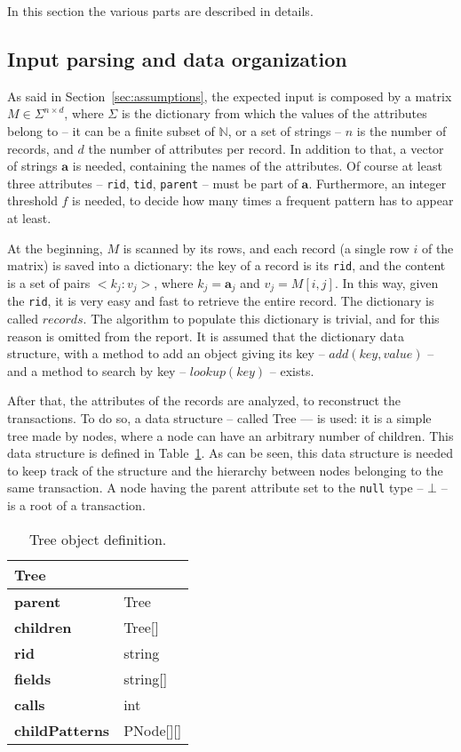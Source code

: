 \documentclass{acm_proc_article-sp-sigmod09}
\begin{document}
In this section the various parts are described in details.

\subsection{Input parsing and data organization}
As said in Section~\ref{sec:assumptions}, the expected input is composed by a matrix $M \in \Sigma^{n \times d}$, where $\Sigma$ is the dictionary from which the values of the attributes belong to -- it can be a finite subset of $\mathbb{N}$, or a set of strings -- $n$ is the number of records, and $d$ the number of attributes per record. In addition to that, a vector of strings $\boldsymbol{a}$ is needed, containing the names of the attributes. Of course at least three attributes -- \texttt{rid}, \texttt{tid}, \texttt{parent} -- must be part of $\boldsymbol{a}$. Furthermore, an integer threshold $f$ is needed, to decide how many times a frequent pattern has to appear at least.

At the beginning, $M$ is scanned by its rows, and each record (a single row $i$ of the matrix) is saved into a dictionary: the key of a record is its \texttt{rid}, and the content is a set of pairs $<k_j \colon v_j>$, where $k_j = \boldsymbol{a}_j$ and $v_j = M[i,j]$. In this way, given the \texttt{rid}, it is very easy and fast to retrieve the entire record. The dictionary is called $records$. The algorithm to populate this dictionary is trivial, and for this reason is omitted from the report. It is assumed that the dictionary data structure, with a method to add an object giving its key -- $add(key, value)$ -- and a method to search by key -- $lookup(key)$ -- exists.

After that, the attributes of the records are analyzed, to reconstruct the transactions. To do so, a data structure -- called Tree --- is used: it is a simple tree made by nodes, where a node can have an arbitrary number of children. This data structure is defined in Table~\ref{tab:tree}. As can be seen, this data structure is needed to keep track of the structure and the hierarchy between nodes belonging to the same transaction. A node having the parent attribute set to the \texttt{null} type -- $\bot$ -- is a root of a transaction.

\begin{table}[H]
\centering
\begin{tabular}{|ll|} \hline
\textbf{Tree} & \\ \hline
\textbf{parent} & Tree \\ \hline
\textbf{children} & Tree[] \\ \hline
\textbf{rid} & string \\ \hline
\textbf{fields} & string[] \\ \hline
\textbf{calls} & int \\ \hline
\textbf{childPatterns} & PNode[][] \\
\hline\end{tabular}
\caption{Tree object definition.}
\label{tab:tree}
\end{table}
\end{document}
